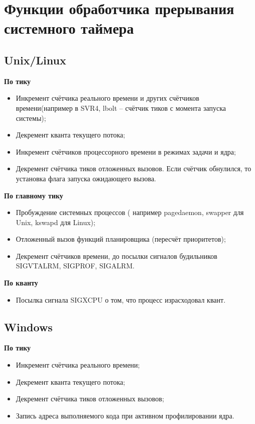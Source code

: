 \chapter{Функции обработчика прерывания системного таймера}

\section{Unix/Linux}

\textbf{По тику}
\begin{itemize}
	\item Инкремент счётчика реального времени и других счётчиков времени(например в SVR4, lbolt -- счётчик тиков с момента запуска системы);
	\item Декремент кванта текущего потока;
	\item Инкремент счётчиков процессорного времени в режимах задачи и ядра;
	\item Декремент счётчика тиков отложенных вызовов. Если счётчик обнулился, то установка флага запуска ожидающего вызова.
\end{itemize}

\textbf{По главному тику}
\begin{itemize}
	\item Пробуждение системных процессов ( например pagedaemon, swapper для Unix, kswapd для Linux);
	\item Отложенный вызов функций планировщика (пересчёт приоритетов);
	\item Декремент счётчиков времени, до посылки сигналов будильников SIGVTALRM, SIGPROF, SIGALRM.
\end{itemize}

\textbf{По кванту}
\begin{itemize}
	\item Посылка сигнала SIGXCPU о том, что процесс израсходовал квант.
\end{itemize}

\section{Windows}

\textbf{По тику}
\begin{itemize}
	\item Инкремент счётчика реального времени;
	\item Декремент кванта текущего потока;
	\item Декремент счётчика тиков отложенных вызовов;
	\item Запись адреса выполняемого кода при активном профилировании ядра.
\end{itemize}

